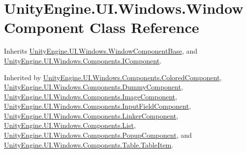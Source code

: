 \hypertarget{class_unity_engine_1_1_u_i_1_1_windows_1_1_window_component}{}\section{Unity\+Engine.\+U\+I.\+Windows.\+Window\+Component Class Reference}
\label{class_unity_engine_1_1_u_i_1_1_windows_1_1_window_component}


Inherits \hyperlink{class_unity_engine_1_1_u_i_1_1_windows_1_1_window_component_base}{Unity\+Engine.\+U\+I.\+Windows.\+Window\+Component\+Base}, and \hyperlink{interface_unity_engine_1_1_u_i_1_1_windows_1_1_components_1_1_i_component}{Unity\+Engine.\+U\+I.\+Windows.\+Components.\+I\+Component}.



Inherited by \hyperlink{class_unity_engine_1_1_u_i_1_1_windows_1_1_components_1_1_colored_component}{Unity\+Engine.\+U\+I.\+Windows.\+Components.\+Colored\+Component}, \hyperlink{class_unity_engine_1_1_u_i_1_1_windows_1_1_components_1_1_dummy_component}{Unity\+Engine.\+U\+I.\+Windows.\+Components.\+Dummy\+Component}, \hyperlink{class_unity_engine_1_1_u_i_1_1_windows_1_1_components_1_1_image_component}{Unity\+Engine.\+U\+I.\+Windows.\+Components.\+Image\+Component}, \hyperlink{class_unity_engine_1_1_u_i_1_1_windows_1_1_components_1_1_input_field_component}{Unity\+Engine.\+U\+I.\+Windows.\+Components.\+Input\+Field\+Component}, \hyperlink{class_unity_engine_1_1_u_i_1_1_windows_1_1_components_1_1_linker_component}{Unity\+Engine.\+U\+I.\+Windows.\+Components.\+Linker\+Component}, \hyperlink{class_unity_engine_1_1_u_i_1_1_windows_1_1_components_1_1_list}{Unity\+Engine.\+U\+I.\+Windows.\+Components.\+List}, \hyperlink{class_unity_engine_1_1_u_i_1_1_windows_1_1_components_1_1_popup_component}{Unity\+Engine.\+U\+I.\+Windows.\+Components.\+Popup\+Component}, and \hyperlink{class_unity_engine_1_1_u_i_1_1_windows_1_1_components_1_1_table_1_1_table_item}{Unity\+Engine.\+U\+I.\+Windows.\+Components.\+Table.\+Table\+Item}.

